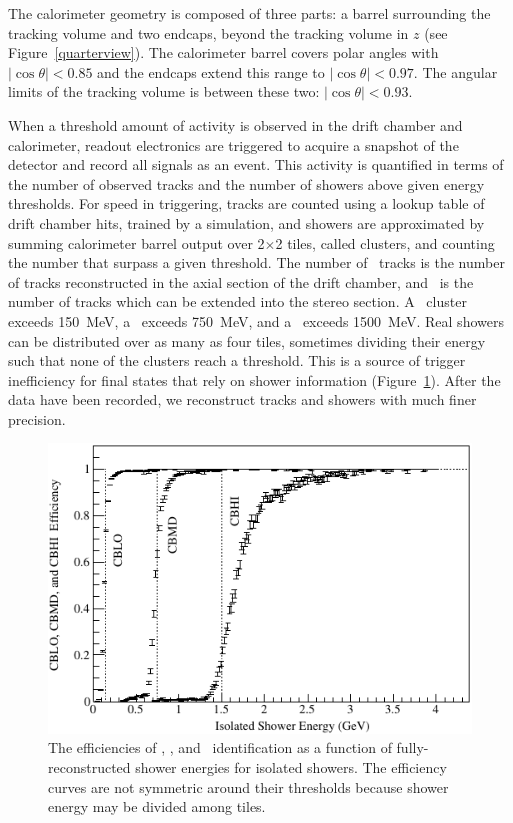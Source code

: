 \documentclass{cornell}
\begin{document}
The calorimeter geometry is composed of three parts: a barrel
surrounding the tracking volume and two endcaps, beyond the tracking
volume in $z$ (see Figure~\ref{quarterview}).  The calorimeter barrel
covers polar angles with $|\cos\theta| < 0.85$ and the endcaps extend
this range to $|\cos\theta| < 0.97$.  The angular limits of the
tracking volume is between these two: $|\cos\theta| < 0.93$.

When a threshold amount of activity is observed in the drift chamber
and calorimeter, readout electronics are triggered to acquire a
snapshot of the detector and record all signals as an event.  This
activity is quantified in terms of the number of observed tracks and
the number of showers above given energy thresholds.  For speed in
triggering, tracks are counted using a lookup table of drift chamber
hits, trained by a simulation, and showers are approximated by summing
calorimeter barrel output over 2$\times$2 tiles, called clusters, and
counting the number that surpass a given threshold.  The number of
\axial\ tracks is the number of tracks reconstructed in the axial
section of the drift chamber, and \stereo\ is the number of tracks
which can be extended into the stereo section.  A \cblo\ cluster
exceeds 150~MeV, a \cbmd\ exceeds 750~MeV, and a \cbhi\ exceeds
1500~MeV.  Real showers can be distributed over as many as four tiles,
sometimes dividing their energy such that none of the clusters reach a
threshold.  This is a source of trigger inefficiency for final states
that rely on shower information (Figure~\ref{topher}).  After the data
have been recorded, we reconstruct tracks and showers with much finer
precision.

\begin{figure}[p]
  \begin{center}
    \includegraphics[width=\linewidth]{plots/topher}
  \end{center}
  \caption[Efficiencies of \cblo, \cbmd, and \cbhi\
  identification]{\label{topher} The efficiencies of \cblo, \cbmd, and
  \cbhi\ identification as a function of fully-reconstructed shower
  energies for isolated showers.  The efficiency curves are not
  symmetric around their thresholds because shower energy may be
  divided among tiles.}
\end{figure}
\end{document}
